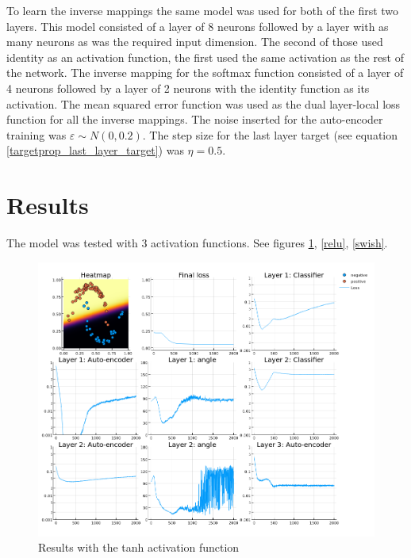 To learn the inverse mappings the same model was used for both of the first two layers. This model consisted of a layer of 8 neurons followed by a layer with as many neurons as was the required input dimension. The second of those used identity as an activation function, the first used the same activation as the rest of the network. The inverse mapping for the softmax function consisted of a layer of 4 neurons followed by a layer of 2 neurons with the identity function as its activation. The mean squared error function was used as the dual layer-local loss function for all the inverse mappings. The noise inserted for the auto-encoder training was \( \varepsilon \sim N \left( 0, 0.2 \right) \). The step size for the last layer target (see equation \ref{targetprop_last_layer_target}) was \( \eta = 0.5 \).

\section{Results}

The model was tested with 3 activation functions. See figures \ref{tanh}, \ref{relu}, \ref{swish}.

\begin{figure}[h]
	\centering
	\includegraphics[width=500pt]{images/temp-tanh.png}
	\caption{Results with the tanh activation function}\label{tanh}
\end{figure}

